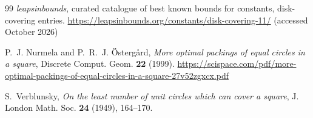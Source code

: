 \begin{thebibliography}{99}
\emph{leapsinbounds}, curated catalogue of best known bounds for constants,
disk-covering entries.
\url{https://leapsinbounds.org/constants/disk-covering-11/}
(accessed October 2026)

P.~J. Nurmela and P.~R.~J. \"Osterg{\aa}rd,
\emph{More optimal packings of equal circles in a square},
Discrete Comput. Geom. \textbf{22} (1999).
\url{https://scispace.com/pdf/more-optimal-packings-of-equal-circles-in-a-square-27v52zgxcx.pdf}

S.~Verblunsky,
\emph{On the least number of unit circles which can cover a square},
J. London Math. Soc. \textbf{24} (1949), 164--170.

\end{thebibliography}
